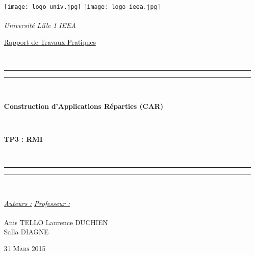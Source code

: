 \thispagestyle{cover}

\texttt{[image: logo\_univ.jpg]} \hfill \texttt{[image: logo\_ieea.jpg]} \\
~\\
\hspace*{0.5cm} {\Large \textit{Université Lille 1}} \hfill {\Large \textit{IEEA}} \hspace*{0.5cm}\\

\vspace*{17mm}

\begin{center}
	\begin{Huge} \underline{Rapport de Travaux Pratiques} \end{Huge}\\[4mm]

	\vspace*{15mm}

	\rule[0.5ex]{\linewidth}{2pt}\vspace*{-\baselineskip}\vspace*{3.2pt}
	\rule[0.5ex]{\linewidth}{1pt}\\[\baselineskip]

		\begin{Huge} \textbf{Construction d'Applications Réparties (CAR)} \end{Huge}\\[4mm]
		\begin{Huge} \textbf{TP3 : RMI} \end{Huge}\\[4mm]

	\rule[0.5ex]{\linewidth}{1pt}\vspace*{-\baselineskip}\vspace{3.2pt}
	\rule[0.5ex]{\linewidth}{2pt}\\

	\vspace*{20mm}

	{\large \textit{\underline{Auteurs :}}} \hfill {\large \textit{\underline{Professeur :}}}\\
	~\\
	{\large Anis TELLO} \hfill {\large Laurence DUCHIEN}\\
	{\large Salla DIAGNE} \hfill {\large}
	
	\vspace*{20mm}
	
	{\large\textsc{31 Mars 2015}}
\end{center}